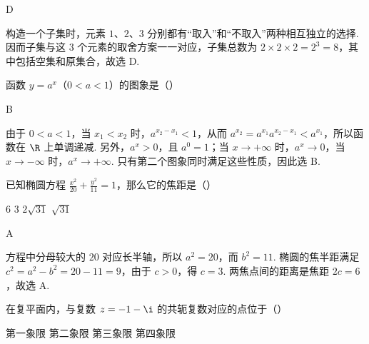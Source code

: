\documentclass[UTF8,a4paper,oneside,11pt]{ctexbook}
\begin{document}
\begin{answer}
D
\end{answer}

\begin{solution}
构造一个子集时，元素 \(1\)、\(2\)、\(3\) 分别都有“取入”和“不取入”两种相互独立的选择. 因而子集与这 \(3\) 个元素的取舍方案一一对应，子集总数为 \(2\times2\times2=2^3=8\)，其中包括空集和原集合，故选 D.
\end{solution}

\begin{problem}
函数 \(y = a^x\)（\(0 < a < 1\)）的图象是（\quad）

\choices
    {}
    {}
    {}
    {}
\end{problem}

\begin{answer}
B
\end{answer}

\begin{solution}
由于 \(0<a<1\)，当 \(x_1<x_2\) 时，\(a^{x_2-x_1}<1\)，从而
\(a^{x_2}=a^{x_1}a^{x_2-x_1}<a^{x_1}\)，所以函数在 \(\R\) 上单调递减. 另外，\(a^x>0\)，且 \(a^0=1\)；当 \(x\to+\infty\) 时，\(a^x\to0\)，当 \(x\to-\infty\) 时，\(a^x\to+\infty\). 只有第二个图象同时满足这些性质，因此选 B.
\end{solution}

\begin{problem}
已知椭圆方程 \(\frac{x^2}{20} + \frac{y^2}{11} = 1\)，那么它的焦距是（\quad）

\choices
    {\(6\)}
    {\(3\)}
    {\(2\sqrt{31}\)}
    {\(\sqrt{31}\)}
\end{problem}

\begin{answer}
A
\end{answer}

\begin{solution}
方程中分母较大的 \(20\) 对应长半轴，所以 \(a^2=20\)，而 \(b^2=11\). 椭圆的焦半距满足
\(c^2=a^2-b^2=20-11=9\)，由于 \(c>0\)，得 \(c=3\). 两焦点间的距离是焦距 \(2c=6\)，故选 A.
\end{solution}

\begin{problem}
在复平面内，与复数 \(z = -1 - \i\) 的共轭复数对应的点位于（\quad）

\choices
    {第一象限}
    {第二象限}
    {第三象限}
    {第四象限}
\end{problem}
\end{document}
